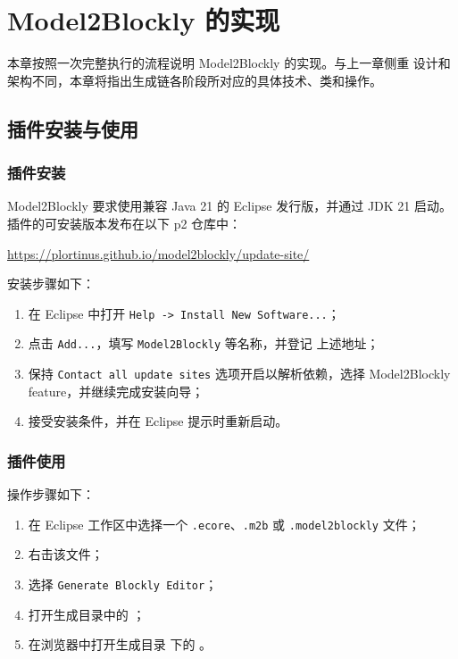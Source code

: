 \chapter{Model2Blockly 的实现}
\label{chap:implementacion}

本章按照一次完整执行的流程说明 Model2Blockly 的实现。与上一章侧重
设计和架构不同，本章将指出生成链各阶段所对应的具体技术、类和操作。

\section{插件安装与使用}
\label{sec:ejecucion-model2blockly}

\subsection{插件安装}

\begin{samepage}
Model2Blockly 要求使用兼容 Java 21 的 Eclipse 发行版，并通过 JDK 21
启动。插件的可安装版本发布在以下 p2 仓库中：

\begin{center}
  \url{https://plortinus.github.io/model2blockly/update-site/}
\end{center}
\end{samepage}

安装步骤如下：

\begin{enumerate}
  \item 在 Eclipse 中打开 \texttt{Help -> Install New Software...}；
  \item 点击 \texttt{Add...}，填写 \texttt{Model2Blockly} 等名称，并登记
  上述地址；
  \item 保持 \texttt{Contact all update sites} 选项开启以解析依赖，选择
  Model2Blockly feature，并继续完成安装向导；
  \item 接受安装条件，并在 Eclipse 提示时重新启动。
\end{enumerate}

\subsection{插件使用}

操作步骤如下：

\begin{enumerate}
  \item 在 Eclipse 工作区中选择一个 \texttt{.ecore}、\texttt{.m2b}
  或 \texttt{.model2blockly} 文件；
  \item 右击该文件；
  \item 选择 \texttt{Generate Blockly Editor}；
  \item 打开生成目录中的 ；
  \item 在浏览器中打开生成目录  下的
  。
\end{enumerate}

